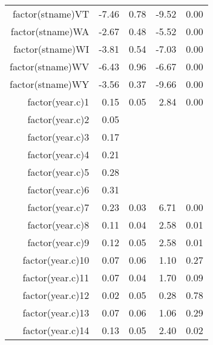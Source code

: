 \begin{table}[ht]
\begin{tabular}{rrrrr}
  factor(stname)VT & -7.46 & 0.78 & -9.52 & 0.00 \\ 
  factor(stname)WA & -2.67 & 0.48 & -5.52 & 0.00 \\ 
  factor(stname)WI & -3.81 & 0.54 & -7.03 & 0.00 \\ 
  factor(stname)WV & -6.43 & 0.96 & -6.67 & 0.00 \\ 
  factor(stname)WY & -3.56 & 0.37 & -9.66 & 0.00 \\ 
  factor(year.c)1 & 0.15 & 0.05 & 2.84 & 0.00 \\ 
  factor(year.c)2 & 0.05 &  &  &  \\ 
  factor(year.c)3 & 0.17 &  &  &  \\ 
  factor(year.c)4 & 0.21 &  &  &  \\ 
  factor(year.c)5 & 0.28 &  &  &  \\ 
  factor(year.c)6 & 0.31 &  &  &  \\ 
  factor(year.c)7 & 0.23 & 0.03 & 6.71 & 0.00 \\ 
  factor(year.c)8 & 0.11 & 0.04 & 2.58 & 0.01 \\ 
  factor(year.c)9 & 0.12 & 0.05 & 2.58 & 0.01 \\ 
  factor(year.c)10 & 0.07 & 0.06 & 1.10 & 0.27 \\ 
  factor(year.c)11 & 0.07 & 0.04 & 1.70 & 0.09 \\ 
  factor(year.c)12 & 0.02 & 0.05 & 0.28 & 0.78 \\ 
  factor(year.c)13 & 0.07 & 0.06 & 1.06 & 0.29 \\ 
  factor(year.c)14 & 0.13 & 0.05 & 2.40 & 0.02 \\ 
   \hline
\end{tabular}
\end{table}
